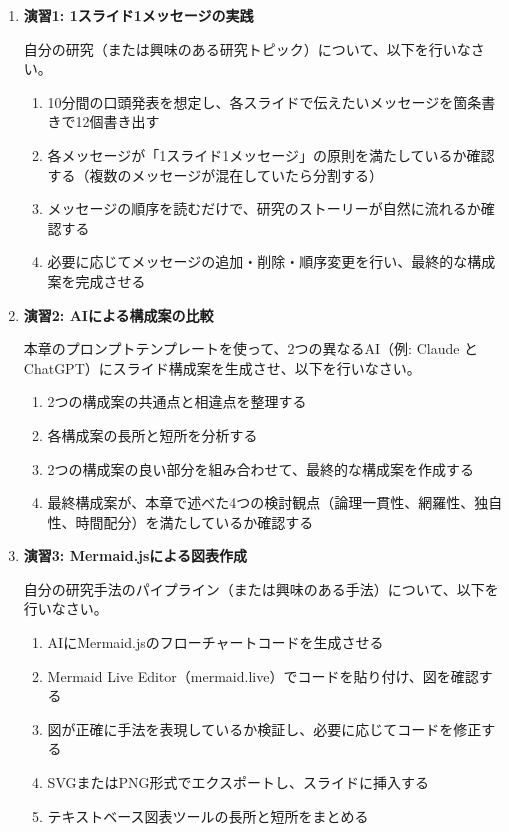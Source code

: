 \begin{enumerate}

\item \textbf{演習1: 1スライド1メッセージの実践}

自分の研究（または興味のある研究トピック）について、以下を行いなさい。
\begin{enumerate}
\item 10分間の口頭発表を想定し、各スライドで伝えたいメッセージを箇条書きで12個書き出す
\item 各メッセージが「1スライド1メッセージ」の原則を満たしているか確認する（複数のメッセージが混在していたら分割する）
\item メッセージの順序を読むだけで、研究のストーリーが自然に流れるか確認する
\item 必要に応じてメッセージの追加・削除・順序変更を行い、最終的な構成案を完成させる
\end{enumerate}

\item \textbf{演習2: AIによる構成案の比較}

本章のプロンプトテンプレートを使って、2つの異なるAI（例: Claude と ChatGPT）にスライド構成案を生成させ、以下を行いなさい。
\begin{enumerate}
\item 2つの構成案の共通点と相違点を整理する
\item 各構成案の長所と短所を分析する
\item 2つの構成案の良い部分を組み合わせて、最終的な構成案を作成する
\item 最終構成案が、本章で述べた4つの検討観点（論理一貫性、網羅性、独自性、時間配分）を満たしているか確認する
\end{enumerate}

\item \textbf{演習3: Mermaid.jsによる図表作成}

自分の研究手法のパイプライン（または興味のある手法）について、以下を行いなさい。
\begin{enumerate}
\item AIにMermaid.jsのフローチャートコードを生成させる
\item Mermaid Live Editor（mermaid.live）でコードを貼り付け、図を確認する
\item 図が正確に手法を表現しているか検証し、必要に応じてコードを修正する
\item SVGまたはPNG形式でエクスポートし、スライドに挿入する
\item テキストベース図表ツールの長所と短所をまとめる
\end{enumerate}


\end{enumerate}
